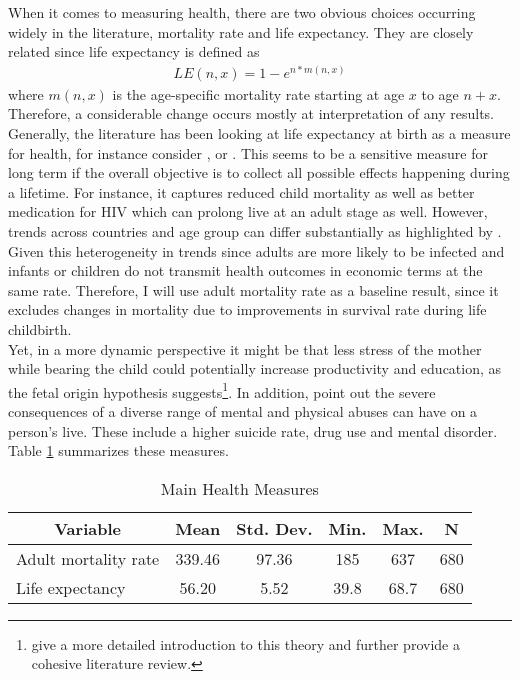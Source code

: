 \documentclass{article}
\begin{document}
When it comes to measuring health, there are two obvious choices occurring widely in the literature, mortality rate and life expectancy. They are closely related since life expectancy is defined as
\begin{align} 
LE(n,x) = 1 - e^{n*m(n,x)}
\end{align}
where $m(n,x)$ is the age-specific mortality rate starting at age $x$ to age $n + x$. Therefore, a considerable change occurs mostly at interpretation of any results. \\
Generally, the literature has been looking at life expectancy at birth as a measure for health, for instance consider \cite{bloom2018health}, \cite{acemoglu2007disease} or \cite{bloom2014disease}. This seems to be a sensitive measure for long term if the overall objective is to collect all possible effects happening during a lifetime. For instance, it captures reduced child mortality as well as better medication for HIV which can prolong live at an adult stage as well. However, trends across countries and age group can differ substantially as highlighted by \cite{mcmichael2004mortality}. Given this heterogeneity in trends since adults are more likely to be infected and infants or children do not transmit health outcomes in economic terms at the same rate. Therefore, I will use adult mortality rate as a baseline result, since it excludes changes in mortality due to improvements in survival rate during life childbirth. \\
Yet, in a more dynamic perspective it might be that less stress of the mother while bearing the child could potentially increase productivity and education, as the fetal origin hypothesis suggests\footnote{ \cite{almond2011killing} give a more detailed introduction to this theory and further provide a cohesive literature review.}. In addition, \cite{norman2012long} point out the severe consequences of a diverse range of mental and physical abuses can have on a person's live. These include a higher suicide rate, drug use and mental disorder. \\
Table \ref{Main Health Measures} summarizes these measures.

\begin{table}[htbp]\centering \caption{Main Health Measures \label{Main Health Measures}}
\begin{tabular}{l c c c c c}\hline\hline
\multicolumn{1}{c}{\textbf{Variable}} & \textbf{Mean}
 & \textbf{Std. Dev.}& \textbf{Min.} &  \textbf{Max.} & \textbf{N}\\ \hline
Adult mortality rate & 339.46 & 97.36 & 185 & 637 & 680\\
Life expectancy & 56.20 & 5.52 & 39.8 & 68.7 & 680 \\
\hline\end{tabular}
\end{table}
\end{document}
